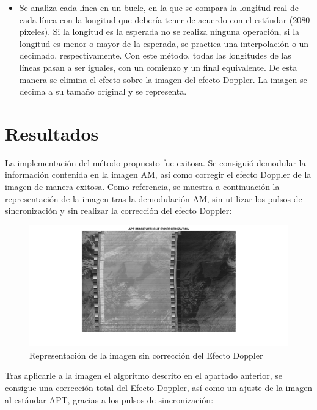 \documentclass[a4paper,openright,12pt]{article}
\begin{document}
\begin{itemize}
\begin{itemize}
	\item Se analiza cada línea en un bucle, en la que se compara la longitud real de cada línea con la longitud que debería tener de acuerdo con el estándar (2080 píxeles). Si la longitud es la esperada no se realiza ninguna operación, si la longitud es menor o mayor de la esperada, se practica una interpolación o un decimado, respectivamente. Con este método, todas las longitudes de las líneas pasan a ser iguales, con un comienzo y un final equivalente. De esta manera se elimina el efecto sobre la imagen del efecto Doppler. La imagen se decima a su tamaño original y se representa.
	




\end{itemize}
	

	
	
	\end{itemize}

\section{Resultados}

La implementación del método propuesto fue exitosa. Se consiguió demodular la información contenida en la imagen AM, así como corregir el efecto Doppler de la imagen de manera exitosa. Como referencia, se muestra a continuación la representación de la imagen tras la demodulación AM, sin utilizar los pulsos de sincronización y sin realizar la corrección del efecto Doppler:


 \begin{figure}[hbtp]
 \centering
 \includegraphics[width = 17cm]{imagenes/31_01_nosynch.png}
 \caption{Representación de la imagen sin corrección del Efecto Doppler}
 \label{apt_nosynch}
 \end{figure}
 
 Tras aplicarle a la imagen el algoritmo descrito en el apartado anterior, se consigue una corrección total del Efecto Doppler, así como un ajuste de la imagen al estándar APT, gracias a los pulsos de sincronización:
\end{document}
